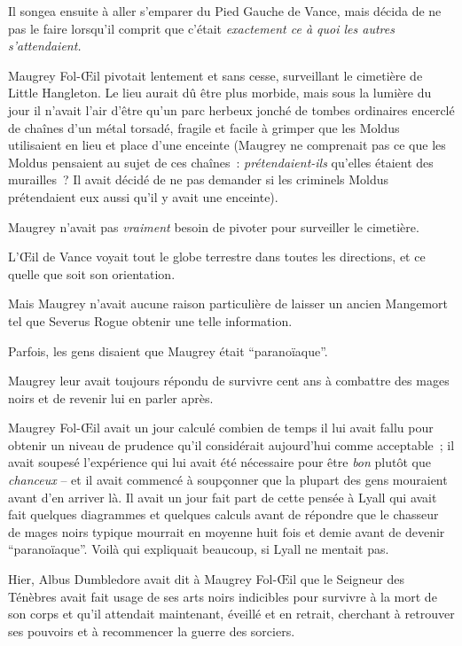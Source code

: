 Il songea ensuite à aller s'emparer du Pied Gauche de Vance, mais décida de ne pas le faire lorsqu'il comprit que c'était \emph{exactement ce à quoi les autres s'attendaient.}

Maugrey Fol-Œil pivotait lentement et sans cesse, surveillant le cimetière de Little Hangleton.
Le lieu aurait dû être plus morbide, mais sous la lumière du jour il n'avait l'air d'être qu'un parc herbeux jonché de tombes ordinaires encerclé de chaînes d'un métal torsadé, fragile et facile à grimper que les Moldus utilisaient en lieu et place d'une enceinte (Maugrey ne comprenait pas ce que les Moldus pensaient au sujet de ces chaînes~: \emph{prétendaient-ils} qu'elles étaient des murailles~?
Il avait décidé de ne pas demander si les criminels Moldus prétendaient eux aussi qu'il y avait une enceinte).

Maugrey n'avait pas \emph{vraiment} besoin de pivoter pour surveiller le cimetière.

L'Œil de Vance voyait tout le globe terrestre dans toutes les directions, et ce quelle que soit son orientation.

Mais Maugrey n'avait aucune raison particulière de laisser un ancien Mangemort tel que Severus Rogue obtenir une telle information.

Parfois, les gens disaient que Maugrey était “paranoïaque”.

Maugrey leur avait toujours répondu de survivre cent ans à combattre des mages noirs et de revenir lui en parler après.

Maugrey Fol-Œil avait un jour calculé combien de temps il lui avait fallu pour obtenir un niveau de prudence qu'il considérait aujourd'hui comme acceptable~; il avait soupesé l'expérience qui lui avait été nécessaire pour être \emph{bon} plutôt que \emph{chanceux} -- et il avait commencé à soupçonner que la plupart des gens mouraient avant d'en arriver là.
Il avait un jour fait part de cette pensée à Lyall qui avait fait quelques diagrammes et quelques calculs avant de répondre que le chasseur de mages noirs typique mourrait en moyenne huit fois et demie avant de devenir “paranoïaque”.
Voilà qui expliquait beaucoup, si Lyall ne mentait pas.

Hier, Albus Dumbledore avait dit à Maugrey Fol-Œil que le Seigneur des Ténèbres avait fait usage de ses arts noirs indicibles pour survivre à la mort de son corps et qu'il attendait maintenant, éveillé et en retrait, cherchant à retrouver ses pouvoirs et à recommencer la guerre des sorciers.

